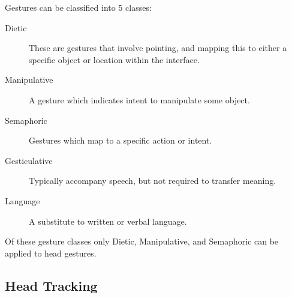 
Gestures can be classified into 5 classes\cite{karam2005taxonomy}:
\begin{description}
    \item[Dietic] These are gestures that involve pointing, and mapping this to either a specific object or location within the interface.
    \item[Manipulative] A gesture which indicates intent to manipulate some object.
    \item[Semaphoric] Gestures which map to a specific action or intent.
    \item[Gesticulative] Typically accompany speech, but not required to transfer meaning.
    \item[Language] A substitute to written or verbal language.
\end{description}
Of these gesture classes only Dietic, Manipulative, and Semaphoric can be applied to head gestures.

\subsection{Head Tracking}
